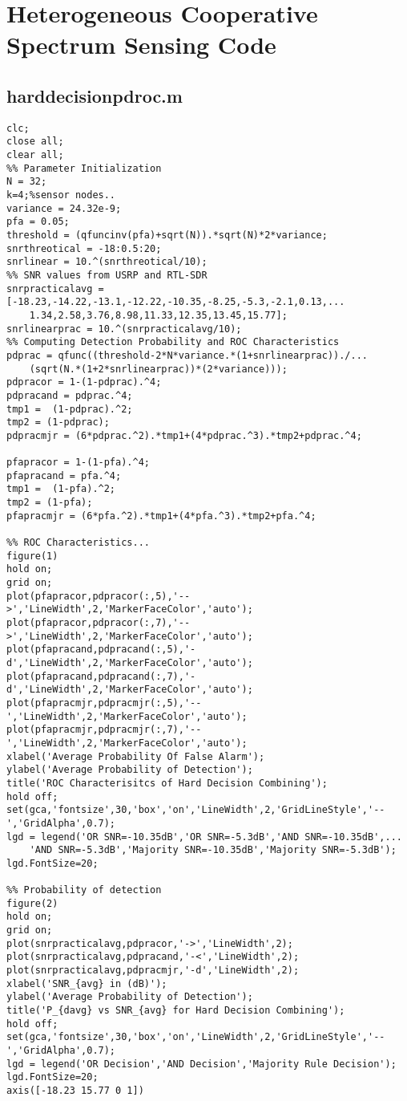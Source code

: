 \chapter{Heterogeneous Cooperative Spectrum Sensing Code}
\section{harddecisionpdroc.m}
\begin{lstlisting}[breaklines]
% Hard-Decision Combining Results For Sensor Nodes
clc;
close all;
clear all;
%% Parameter Initialization
N = 32;
k=4;%sensor nodes..
variance = 24.32e-9;
pfa = 0.05;
threshold = (qfuncinv(pfa)+sqrt(N)).*sqrt(N)*2*variance;
snrthreotical = -18:0.5:20;
snrlinear = 10.^(snrthreotical/10);
%% SNR values from USRP and RTL-SDR
snrpracticalavg = [-18.23,-14.22,-13.1,-12.22,-10.35,-8.25,-5.3,-2.1,0.13,...
    1.34,2.58,3.76,8.98,11.33,12.35,13.45,15.77];
snrlinearprac = 10.^(snrpracticalavg/10);
%% Computing Detection Probability and ROC Characteristics
pdprac = qfunc((threshold-2*N*variance.*(1+snrlinearprac))./...
    (sqrt(N.*(1+2*snrlinearprac))*(2*variance)));
pdpracor = 1-(1-pdprac).^4;
pdpracand = pdprac.^4;
tmp1 =  (1-pdprac).^2;
tmp2 = (1-pdprac);
pdpracmjr = (6*pdprac.^2).*tmp1+(4*pdprac.^3).*tmp2+pdprac.^4;

pfapracor = 1-(1-pfa).^4;
pfapracand = pfa.^4;
tmp1 =  (1-pfa).^2;
tmp2 = (1-pfa);
pfapracmjr = (6*pfa.^2).*tmp1+(4*pfa.^3).*tmp2+pfa.^4;

%% ROC Characteristics...
figure(1)
hold on;
grid on;
plot(pfapracor,pdpracor(:,5),'-->','LineWidth',2,'MarkerFaceColor','auto');
plot(pfapracor,pdpracor(:,7),'-->','LineWidth',2,'MarkerFaceColor','auto');
plot(pfapracand,pdpracand(:,5),'-d','LineWidth',2,'MarkerFaceColor','auto');
plot(pfapracand,pdpracand(:,7),'-d','LineWidth',2,'MarkerFaceColor','auto');
plot(pfapracmjr,pdpracmjr(:,5),'--','LineWidth',2,'MarkerFaceColor','auto');
plot(pfapracmjr,pdpracmjr(:,7),'--','LineWidth',2,'MarkerFaceColor','auto');
xlabel('Average Probability Of False Alarm');
ylabel('Average Probability of Detection');
title('ROC Characterisitcs of Hard Decision Combining');
hold off;
set(gca,'fontsize',30,'box','on','LineWidth',2,'GridLineStyle','--','GridAlpha',0.7);
lgd = legend('OR SNR=-10.35dB','OR SNR=-5.3dB','AND SNR=-10.35dB',...
    'AND SNR=-5.3dB','Majority SNR=-10.35dB','Majority SNR=-5.3dB');
lgd.FontSize=20;

%% Probability of detection
figure(2)
hold on;
grid on;
plot(snrpracticalavg,pdpracor,'->','LineWidth',2);
plot(snrpracticalavg,pdpracand,'-<','LineWidth',2);
plot(snrpracticalavg,pdpracmjr,'-d','LineWidth',2);
xlabel('SNR_{avg} in (dB)');
ylabel('Average Probability of Detection');
title('P_{davg} vs SNR_{avg} for Hard Decision Combining');
hold off;
set(gca,'fontsize',30,'box','on','LineWidth',2,'GridLineStyle','--','GridAlpha',0.7);
lgd = legend('OR Decision','AND Decision','Majority Rule Decision');
lgd.FontSize=20;
axis([-18.23 15.77 0 1])
\end{lstlisting}


